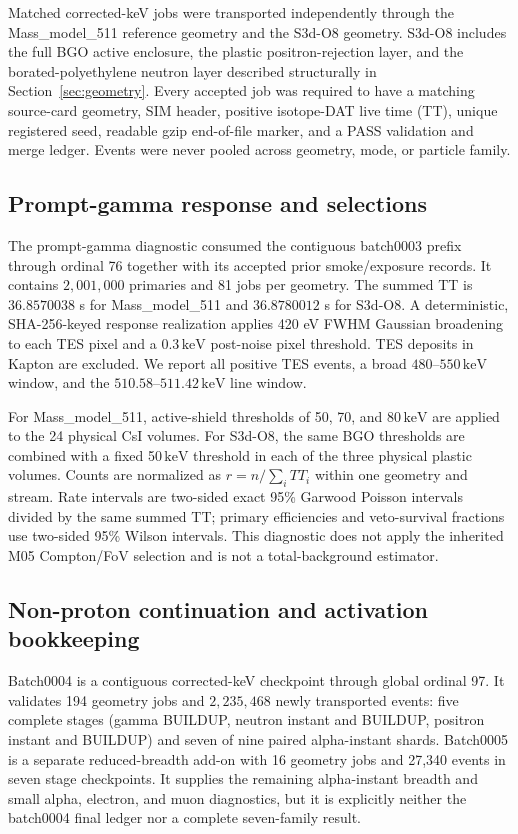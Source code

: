 \documentclass[11pt]{article}
\newcommand{\keV}{\ensuremath{\,\mathrm{keV}}}
\begin{document}
Matched corrected-keV jobs were transported independently through the
Mass\_model\_511 reference geometry and the S3d-O8 geometry. S3d-O8 includes the
full BGO active enclosure, the plastic positron-rejection layer, and the
borated-polyethylene neutron layer described structurally in
Section~\ref{sec:geometry}. Every accepted job was required to have a matching
source-card geometry, SIM header, positive isotope-DAT live time (TT), unique
registered seed, readable gzip end-of-file marker, and a PASS validation and
merge ledger. Events were never pooled across geometry, mode, or particle
family.

\subsection{Prompt-gamma response and selections}
\label{sec:selection}

The prompt-gamma diagnostic consumed the contiguous batch0003 prefix through
ordinal 76 together with its accepted prior smoke/exposure records. It contains
$2{,}001{,}000$ primaries and 81 jobs per geometry. The summed TT is
$36.8570038$ s for Mass\_model\_511 and $36.8780012$ s for S3d-O8. A deterministic,
SHA-256-keyed response realization applies 420 eV FWHM Gaussian broadening to
each TES pixel and a 0.3\keV{} post-noise pixel threshold. TES deposits in Kapton
are excluded. We report all positive TES events, a broad $480$--$550\keV$
window, and the $510.58$--$511.42\keV$ line window.

For Mass\_model\_511, active-shield thresholds of 50, 70, and 80\keV{} are
applied to the 24 physical CsI volumes. For S3d-O8, the same BGO thresholds are
combined with a fixed 50\keV{} threshold in each of the three physical plastic
volumes. Counts are normalized as $r=n/\sum_i TT_i$ within one geometry and
stream. Rate intervals are two-sided exact 95\% Garwood Poisson intervals divided
by the same summed TT; primary efficiencies and veto-survival fractions use
two-sided 95\% Wilson intervals. This diagnostic does not apply the inherited
M05 Compton/FoV selection and is not a total-background estimator.

\subsection{Non-proton continuation and activation bookkeeping}

Batch0004 is a contiguous corrected-keV checkpoint through global ordinal 97.
It validates 194 geometry jobs and $2{,}235{,}468$ newly transported events:
five complete stages (gamma BUILDUP, neutron instant and BUILDUP, positron
instant and BUILDUP) and seven of nine paired alpha-instant shards. Batch0005
is a separate reduced-breadth add-on with 16 geometry jobs and 27,340 events in
seven stage checkpoints. It supplies the remaining alpha-instant breadth and
small alpha, electron, and muon diagnostics, but it is explicitly neither the
batch0004 final ledger nor a complete seven-family result.
\end{document}
